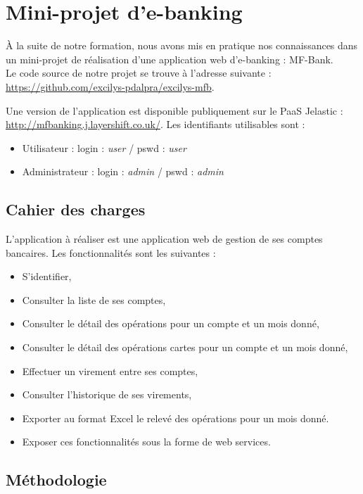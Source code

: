 \section{Mini-projet d'e-banking}

À la suite de notre formation, nous avons mis en pratique nos connaissances dans un mini-projet de réalisation d'une application web d'e-banking : MF-Bank.\\

Le code source de notre projet se trouve à l'adresse suivante : \url{https://github.com/excilys-pdalpra/excilys-mfb}.

Une version de l'application est disponible publiquement sur le PaaS Jelastic\cite{jelastic} : \url{ http://mfbanking.j.layershift.co.uk/}. Les identifiants utilisables sont :

\begin{itemize}
	\item Utilisateur : login : \textit{user} / pswd : \textit{user}
	\item Administrateur : login : \textit{admin} / pswd : \textit{admin}
\end{itemize}

\subsection{Cahier des charges}

L'application à réaliser est une application web de gestion de ses comptes bancaires. Les fonctionnalités sont les suivantes :

\begin{itemize}
	\item S'identifier,
	\item Consulter la liste de ses comptes,
	\item Consulter le détail des opérations pour un compte et un mois donné,
	\item Consulter le détail des opérations cartes pour un compte et un mois donné,
	\item Effectuer un virement entre ses comptes,
	\item Consulter l'historique de ses virements,
	\item Exporter au format Excel le relevé des opérations pour un mois donné.
	\item Exposer ces fonctionnalités sous la forme de web services.
\end{itemize}

\subsection{Méthodologie}

